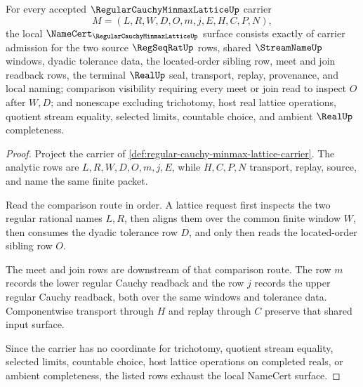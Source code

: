 \begin{theorem}
\label{thm:regular-cauchy-minmax-lattice-namecert-obligations}
For every accepted $\RegularCauchyMinmaxLatticeUp$ carrier
$$
M=(L,R,W,D,O,m,j,E,H,C,P,N),
$$
the local $\NameCert_{\RegularCauchyMinmaxLatticeUp}$ surface consists exactly of carrier admission for the two source $\RegSeqRatUp$ rows, shared $\StreamNameUp$ windows, dyadic tolerance data, the located-order sibling row, meet and join readback rows, the terminal $\RealUp$ seal, transport, replay, provenance, and local naming; comparison visibility requiring every meet or join read to inspect $O$ after $W,D$; and nonescape excluding trichotomy, host real lattice operations, quotient stream equality, selected limits, countable choice, and ambient $\RealUp$ completeness.
\end{theorem}
\begin{proof}
Project the carrier of \autoref{def:regular-cauchy-minmax-lattice-carrier}. The analytic rows are $L,R,W,D,O,m,j,E$, while $H,C,P,N$ transport, replay, source, and name the same finite packet.

Read the comparison route in order. A lattice request first inspects the two regular rational names $L,R$, then aligns them over the common finite window $W$, then consumes the dyadic tolerance row $D$, and only then reads the located-order sibling row $O$.

The meet and join rows are downstream of that comparison route. The row $m$ records the lower regular Cauchy readback and the row $j$ records the upper regular Cauchy readback, both over the same windows and tolerance data. Componentwise transport through $H$ and replay through $C$ preserve that shared input surface.

Since the carrier has no coordinate for trichotomy, quotient stream equality, selected limits, countable choice, host lattice operations on completed reals, or ambient completeness, the listed rows exhaust the local NameCert surface.
\end{proof}


